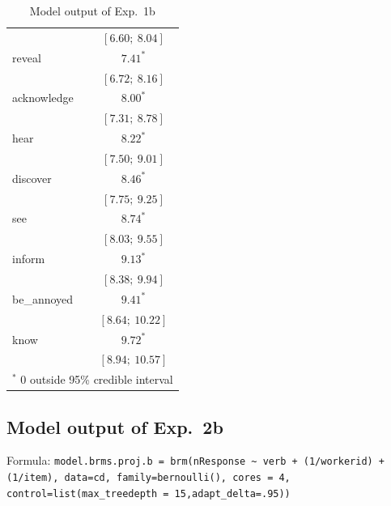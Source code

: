 \documentclass[11pt,fleqn]{article}
\newcommand{\6}{\mbox{$[\hspace*{-.6mm}[$}}
\newcommand{\9}{\mbox{$]\hspace*{-.6mm}]$}}
\begin{document}
{\begin{table}
\begin{center}
\begin{tabular}{l c }
                   & $[6.60;\ 8.04]$   \\
reveal      & $7.41^{*}$        \\
                   & $[6.72;\ 8.16]$   \\
acknowledge & $8.00^{*}$        \\
                   & $[7.31;\ 8.78]$   \\
hear        & $8.22^{*}$        \\
                   & $[7.50;\ 9.01]$   \\
discover    & $8.46^{*}$        \\
                   & $[7.75;\ 9.25]$   \\
see         & $8.74^{*}$        \\
                   & $[8.03;\ 9.55]$   \\
inform      & $9.13^{*}$        \\
                   & $[8.38;\ 9.94]$   \\
be\_annoyed & $9.41^{*}$        \\
                   & $[8.64;\ 10.22]$  \\
know        & $9.72^{*}$        \\
                   & $[8.94;\ 10.57]$  \\
\hline
\multicolumn{2}{l}{\scriptsize{$^*$ 0 outside 95\% credible interval}}
\end{tabular}
\caption{Model output of Exp.~1b}
\label{table:coefficients1b}
\end{center}
\end{table}

\subsection{Model output of Exp.~2b}

Formula: \tiny \verb|model.brms.proj.b = brm(nResponse ~ verb + (1/workerid) + (1/item), data=cd, family=bernoulli(), cores = 4, control=list(max_treedepth = 15,adapt_delta=.95))| \normalsize

}
\end{document}
